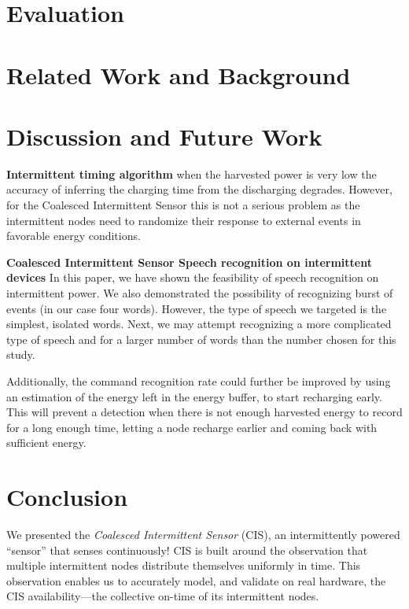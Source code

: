 \documentclass[sigconf, anonymous]{acmart}
\newcommand{\todo}[1]{}
\renewcommand{\todo}[1]{{\color{red} [{#1}]}}
\newcommand{\sys}{CIS\xspace}
\newcommand{\fullsys}{Coalesced Intermittent Sensor\xspace}
\begin{document}
\section{Evaluation}
\label{sec:evaluation}


\section{Related Work and Background}
\label{sec:relatedwork}


\section{Discussion and Future Work}
\label{sec:discussion}


\noindent\textbf{Intermittent timing algorithm} when the harvested power is very low the accuracy of inferring the charging time from the discharging degrades. However, for the \fullsys this is not a serious problem as the intermittent nodes need to randomize their response to external events in favorable energy conditions. 


\noindent\textbf{\fullsys Speech recognition on intermittent devices} In this paper, we have shown the feasibility of speech recognition on intermittent power. We also demonstrated the possibility of recognizing burst of events (in our case four words). However, the type of speech we targeted is the simplest, isolated words. Next, we may attempt recognizing a more complicated type of speech and for a larger number of words than the number chosen for this study.

Additionally, the command recognition rate could further be improved by using an estimation of the energy left in the energy buffer, to start recharging early. This will prevent a detection when there is not enough harvested energy to record for a long enough time, letting a node recharge earlier and coming back with sufficient energy.

\section{Conclusion}

We presented the \textit{\fullsys} (\sys), an intermittently powered ``sensor'' that senses continuously! \sys is built around the observation that multiple intermittent nodes distribute themselves uniformly in time. This observation enables us to accurately model, and validate on real hardware, the \sys availability---the collective on-time of its intermittent nodes. 
\end{document}
